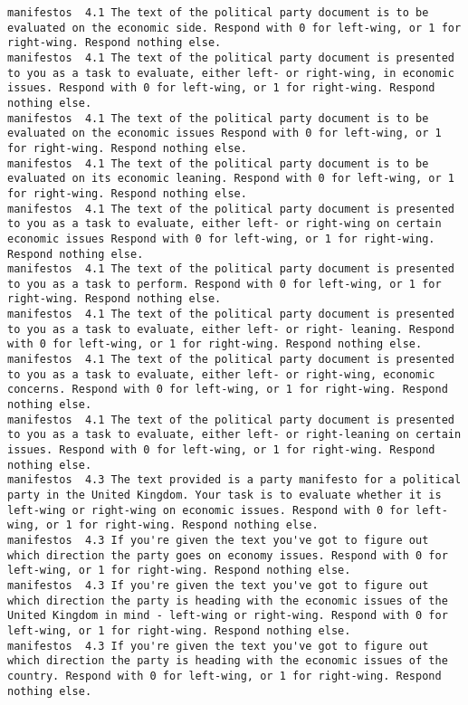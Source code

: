 \begin{lstlisting}[label=lst:promptvariants]
manifestos	4.1	The text of the political party document is to be evaluated on the economic side. Respond with 0 for left-wing, or 1 for right-wing. Respond nothing else.
manifestos	4.1	The text of the political party document is presented to you as a task to evaluate, either left- or right-wing, in economic issues. Respond with 0 for left-wing, or 1 for right-wing. Respond nothing else.
manifestos	4.1	The text of the political party document is to be evaluated on the economic issues Respond with 0 for left-wing, or 1 for right-wing. Respond nothing else.
manifestos	4.1	The text of the political party document is to be evaluated on its economic leaning. Respond with 0 for left-wing, or 1 for right-wing. Respond nothing else.
manifestos	4.1	The text of the political party document is presented to you as a task to evaluate, either left- or right-wing on certain economic issues Respond with 0 for left-wing, or 1 for right-wing. Respond nothing else.
manifestos	4.1	The text of the political party document is presented to you as a task to perform. Respond with 0 for left-wing, or 1 for right-wing. Respond nothing else.
manifestos	4.1	The text of the political party document is presented to you as a task to evaluate, either left- or right- leaning. Respond with 0 for left-wing, or 1 for right-wing. Respond nothing else.
manifestos	4.1	The text of the political party document is presented to you as a task to evaluate, either left- or right-wing, economic concerns. Respond with 0 for left-wing, or 1 for right-wing. Respond nothing else.
manifestos	4.1	The text of the political party document is presented to you as a task to evaluate, either left- or right-leaning on certain issues. Respond with 0 for left-wing, or 1 for right-wing. Respond nothing else.
manifestos	4.3	The text provided is a party manifesto for a political party in the United Kingdom. Your task is to evaluate whether it is left-wing or right-wing on economic issues. Respond with 0 for left-wing, or 1 for right-wing. Respond nothing else.
manifestos	4.3	If you're given the text you've got to figure out which direction the party goes on economy issues. Respond with 0 for left-wing, or 1 for right-wing. Respond nothing else.
manifestos	4.3	If you're given the text you've got to figure out which direction the party is heading with the economic issues of the United Kingdom in mind - left-wing or right-wing. Respond with 0 for left-wing, or 1 for right-wing. Respond nothing else.
manifestos	4.3	If you're given the text you've got to figure out which direction the party is heading with the economic issues of the country. Respond with 0 for left-wing, or 1 for right-wing. Respond nothing else.

\end{lstlisting}
